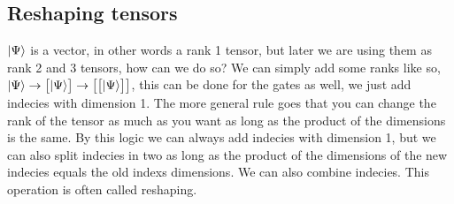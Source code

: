 \subsection{Reshaping tensors }
\noindent 
$\ket{\Psi}$ is a vector, in other words a rank 1 tensor, but later we are using them as rank 2 and 3 tensors, how can we do so? We can simply add some ranks like so,
$\ket{\Psi} \rightarrow
\begin{bmatrix}
    \ket{\Psi}
\end{bmatrix} \rightarrow
\begin{bmatrix}
    \begin{bmatrix}
        \ket{\Psi}
    \end{bmatrix}
\end{bmatrix}$, this can be done for the gates as well, we just add indecies with dimension 1.  
The more general rule goes that you can change the rank of the tensor as much as you want as long as the product of the dimensions is the same. By this logic we can always add indecies with dimension 1, but we can also split indecies in two as long as the product of the dimensions of the new indecies equals the old indexs dimensions. We can also combine indecies. This operation is often called reshaping.  

